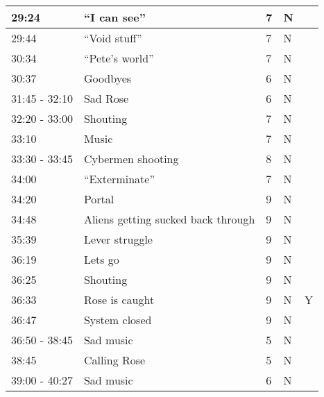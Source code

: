 \begin{longtable}{| p{70pt} | p{130pt} | p{45pt} | p{57pt} | p{60pt}|}
29:24           &          ``I can see''           &          7           &          N&\\\hline       
29:44           &          ``Void stuff''           &          7           &          N&\\\hline       
30:34           &          ``Pete's world''           &          7           &          N&\\\hline       
30:37           &          Goodbyes           &          6           &          N&\\\hline       
31:45 - 32:10           &          Sad Rose           &          6           &          N&\\\hline       
32:20 - 33:00           &          Shouting           &          7           &          N&\\\hline       
33:10           &          Music           &          7           &          N&\\\hline       
33:30 - 33:45           &          Cybermen shooting           &          8           &          N&\\\hline       
34:00           &          ``Exterminate''           &          7           &          N&\\\hline       
34:20           &          Portal           &          9           &          N&\\\hline       
34:48           &          Aliens getting sucked back through           &          9           &          N&\\\hline       
35:39           &          Lever struggle           &          9           &          N&\\\hline       
36:19           &          Lets go           &          9           &          N&\\\hline       
36:25           &          Shouting           &          9           &          N&\\\hline       
36:33           &          Rose is caught           &          9           &          N&Y\\\hline       
36:47           &          System closed           &          9           &          N&\\\hline       
36:50 - 38:45           &          Sad music           &          5           &          N&\\\hline       
38:45           &          Calling Rose           &          5           &          N&\\\hline       
39:00 - 40:27           &          Sad music           &          6           &          N&\\\hline       

\end{longtable}

